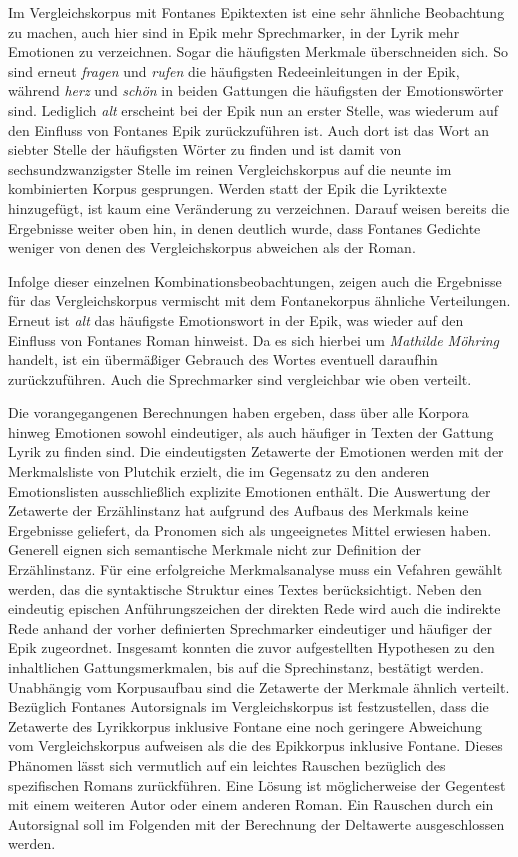 \documentclass[a4paper,10p]{article}
\begin{document}
Im Vergleichskorpus mit Fontanes Epiktexten ist eine sehr ähnliche Beobachtung zu machen, auch hier sind in Epik mehr Sprechmarker, in der Lyrik mehr Emotionen zu verzeichnen. Sogar die häufigsten Merkmale überschneiden sich. So sind erneut \textit{fragen} und \textit{rufen} die häufigsten Redeeinleitungen in der Epik, während \textit{herz} und \textit{schön} in beiden Gattungen die häufigsten der Emotionswörter sind. Lediglich \textit{alt} erscheint bei der Epik nun an erster Stelle, was wiederum auf den Einfluss von Fontanes Epik zurückzuführen ist. Auch dort ist das Wort an siebter Stelle der häufigsten Wörter zu finden und ist damit von sechsundzwanzigster Stelle im reinen Vergleichskorpus auf die neunte im kombinierten Korpus gesprungen. Werden statt der Epik die Lyriktexte hinzugefügt, ist kaum eine Veränderung zu verzeichnen. Darauf weisen bereits die Ergebnisse weiter oben hin, in denen deutlich wurde, dass Fontanes Gedichte weniger von denen des Vergleichskorpus abweichen als der Roman. \par 

Infolge dieser einzelnen Kombinationsbeobachtungen, zeigen auch die Ergebnisse für das Vergleichskorpus vermischt mit dem Fontanekorpus ähnliche Verteilungen. Erneut ist \textit{alt} das häufigste Emotionswort in der Epik, was wieder auf den Einfluss von Fontanes Roman hinweist. Da es sich hierbei um \textit{Mathilde Möhring} handelt, ist ein übermäßiger Gebrauch des Wortes eventuell daraufhin zurückzuführen. Auch die Sprechmarker sind vergleichbar wie oben verteilt. \par 

Die vorangegangenen Berechnungen haben ergeben, dass über alle Korpora hinweg Emotionen sowohl eindeutiger, als auch häufiger in Texten der Gattung Lyrik zu finden sind. Die eindeutigsten Zetawerte der Emotionen werden mit der Merkmalsliste von Plutchik erzielt, die im Gegensatz zu den anderen Emotionslisten ausschließlich explizite Emotionen enthält. Die Auswertung der Zetawerte der Erzählinstanz hat aufgrund des Aufbaus des Merkmals keine Ergebnisse geliefert, da Pronomen sich als ungeeignetes Mittel erwiesen haben. Generell eignen sich semantische Merkmale nicht zur Definition der Erzählinstanz. Für eine erfolgreiche Merkmalsanalyse muss ein Vefahren gewählt werden, das die syntaktische Struktur eines Textes berücksichtigt. Neben den eindeutig epischen Anführungszeichen der direkten Rede wird auch die indirekte Rede anhand der vorher definierten Sprechmarker eindeutiger und häufiger der Epik zugeordnet. Insgesamt konnten die zuvor aufgestellten Hypothesen zu den inhaltlichen Gattungsmerkmalen, bis auf die Sprechinstanz, bestätigt werden. Unabhängig vom Korpusaufbau sind die Zetawerte der Merkmale ähnlich verteilt. Bezüglich Fontanes Autorsignals im Vergleichskorpus ist festzustellen, dass die Zetawerte des Lyrikkorpus inklusive Fontane eine noch geringere Abweichung vom Vergleichskorpus aufweisen als die des Epikkorpus inklusive Fontane. Dieses Phänomen lässt sich vermutlich auf ein leichtes Rauschen bezüglich des spezifischen Romans zurückführen. Eine Lösung ist möglicherweise der Gegentest mit einem weiteren Autor oder einem anderen Roman. Ein Rauschen durch ein Autorsignal soll im Folgenden mit der Berechnung der Deltawerte ausgeschlossen werden.
\end{document}
